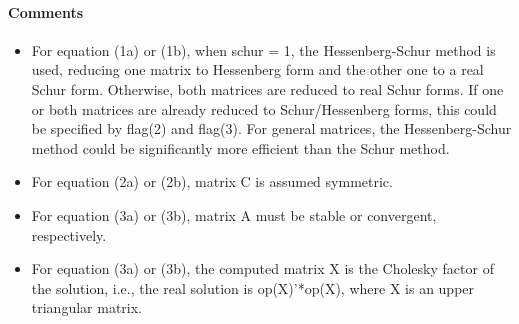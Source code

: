 \paragraph{Comments}
\begin{itemize}
\item {} For equation (1a) or (1b), when schur = 1, the Hessenberg-Schur
  method is used, reducing one matrix to Hessenberg form and the other
  one to a real Schur form. Otherwise, both matrices are reduced to real
  Schur forms. If one or both matrices are already reduced to
  Schur/Hessenberg forms, this could be specified by flag(2) and
  flag(3). For general matrices, the Hessenberg-Schur method could be
  significantly more efficient than the Schur method.
\item {} For equation (2a) or (2b), matrix C is assumed symmetric.
\item {} For equation (3a) or (3b), matrix A must be stable or convergent, respectively.
\item {} For equation (3a) or (3b), the computed matrix X is the Cholesky factor of the solution, i.e., the real solution is op(X)'*op(X), where X is an upper triangular matrix. 
\end{itemize}
